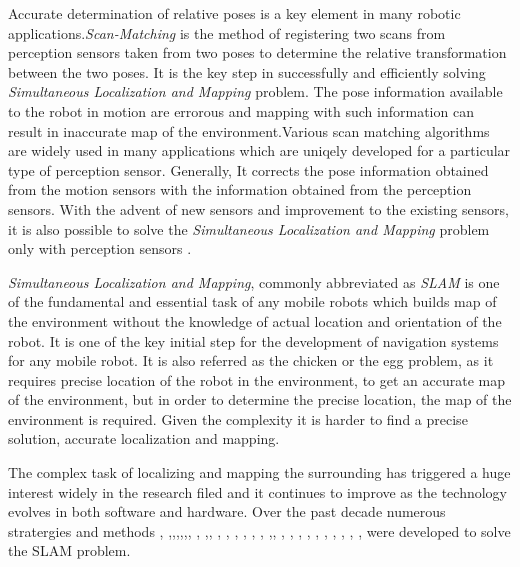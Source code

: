 Accurate determination of relative poses is a key element in many robotic applications.\textit{Scan-Matching} is the method of registering two scans from perception sensors taken from two poses to determine the relative transformation between the two poses. It is the key step in successfully and efficiently solving \textit{Simultaneous Localization and Mapping} problem. The pose information available to the robot in motion are errorous and mapping with such information can result in inaccurate map of the environment.Various scan matching algorithms are widely used in many applications which are uniqely developed for a particular type of perception sensor. Generally, It corrects the pose information obtained from the motion sensors with the information obtained from the perception sensors\cite{GMap_algo}. With the advent of new sensors and improvement to the existing sensors, it is also possible to solve the \textit{Simultaneous Localization and Mapping} problem only with perception sensors \cite{ZhangS14}.

\textit{Simultaneous Localization and Mapping}, commonly abbreviated as \textit{SLAM} is one of the fundamental and essential task of any mobile robots which builds map of the environment without the knowledge of actual location and orientation of the robot. It is one of the key initial step for the development of navigation systems for any mobile robot. It is also referred as  the chicken or the egg problem, as it requires precise location of the robot in the environment, to get an accurate map of the environment, but in order to determine the precise location, the map of the environment is required. Given the complexity it is  harder to find a precise solution, accurate localization and mapping.

The complex task of localizing and mapping the surrounding has triggered a huge interest widely in the research filed and it continues to  improve as the technology evolves in both software and hardware. Over the past decade numerous stratergies and methods \cite{A.Pratik}, \cite{E.Olson_Map},\cite{T.seb_survey},\cite{D.Hahnel},\cite{M.Montemerlo},\cite{W.Burgard},\cite{GMap_algo}, \cite{G.Grisetti}, \cite{J.Kang},\cite{K.Konolige}, \cite{W.Burgard}, \cite{T.Reineking}, \cite{STWBDF}, \cite{D.Droeschel}, \cite{SUMA++}, \cite{VPS_SLAM}, \cite{RT_Graph},\cite{chen2020rss}, \cite{DBLP}, \cite{LOAM}, \cite{ChanWF18}, \cite{TatenoTLN17}, \cite{K.Ryu}, \cite{faucris.119665744}, \cite{Lu-2016-5572}, \cite{Mur_Artal_2015}, \cite{Mur_Artal_2017}, \cite{P.Agarwal}, \cite{segmap2018} were developed to solve the SLAM problem. 

